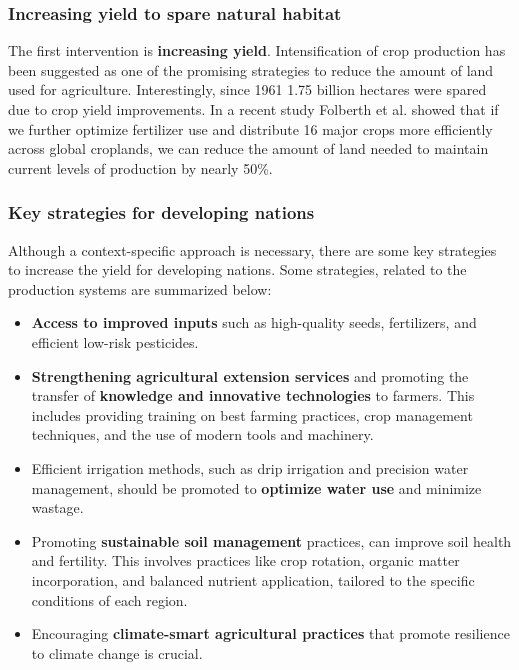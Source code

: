 \documentclass[../summary.tex]{subfiles}
\begin{document}
	\subsubsection{Increasing yield to spare natural habitat}
	
	The first intervention is \textbf{increasing yield}. Intensification of crop production has been suggested as one of the promising strategies to reduce the amount of land used for agriculture. Interestingly, since 1961 1.75 billion hectares were spared due to crop yield improvements. In a recent study Folberth et al. showed that if we further optimize fertilizer use and distribute 16 major crops more efficiently across global croplands, we can reduce the amount of land needed to maintain current levels of production by nearly 50\%.
	
	\subsubsection{Key strategies for developing nations}
	
	Although a context-specific approach is necessary, there are some key strategies to increase the yield for developing nations. Some strategies, related to the production systems are summarized below:
	
	\begin{itemize}
		\item \textbf{Access to improved inputs} such as high-quality seeds, fertilizers, and efficient low-risk pesticides.
		\item \textbf{Strengthening agricultural extension services }and promoting the transfer of \textbf{knowledge and innovative technologies} to farmers. This includes providing training on best farming practices, crop management techniques, and the use of modern tools and machinery.
		\item Efficient irrigation methods, such as drip irrigation and precision water management, should be promoted to \textbf{optimize water use} and minimize wastage.
		\item Promoting \textbf{sustainable soil management} practices, can improve soil health and fertility. This involves practices like crop rotation, organic matter incorporation, and balanced nutrient application, tailored to the specific conditions of each region.
		\item Encouraging \textbf{climate-smart agricultural practices} that promote resilience to climate change is crucial. 	
	\end{itemize} %
	
\end{document}
